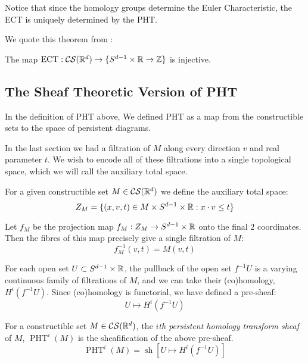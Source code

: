 Notice that since the homology groups determine the Euler Characteristic, the ECT is uniquely determined by the PHT. 

We quote this theorem from \cite{Curry2018Directions}:

\begin{theorem}
    The map \(\operatorname{ECT}:\mathcal{CS}(\mathbb{R}^d)\rightarrow \{S^{d-1}\times \mathbb{R}\rightarrow \mathbb{Z}\}\) is injective.
\end{theorem}

\subsection{The Sheaf Theoretic Version of PHT}

In the definition of PHT above, We defined PHT as a map from the constructible sets to the space of persistent diagrams.





In the last section we had a filtration of \(M\) along every direction \(v\) and real parameter \(t\). We wish to encode all of these filtrations into a single topological space, which we will call the auxiliary total space.

\begin{definition}
    For a given constructible set \(M\in \mathcal{CS}(\mathbb{R}^d)\) we define the auxiliary total space:
    \[Z_M = \{(x,v,t)\in M\times S^{d-1}\times \mathbb{R}: x\cdot v\leq t\}\]
\end{definition}

Let \(f_M\) be the projection map \(f_M:Z_M\rightarrow S^{d-1}\times \mathbb{R}\) onto the final 2 coordinates. Then the fibres of this map precisely give a single filtration of \(M\):
\[f_M^{-1}(v,t)=M(v,t)\]

For each open set \(U\subset S^{d-1}\times \mathbb{R}\), the pullback of the open set \(f^{-1}U\) is a varying continuous family of filtrations of \(M\), and we can take their (co)homology, \(H^i(f^{-1}U)\). Since (co)homology is functorial, we have defined a pre-sheaf:
\[U\mapsto H^i(f^{-1}U)\]

\begin{definition}
    For a constructible set \(M\in\mathcal{CS}(\mathbb{R}^d)\), the \textit{\(i\)th persistent homology transform sheaf} of \(M\), \(\operatorname{PHT}^i(M)\) is the sheafification of the above pre-sheaf.
    \[\operatorname{PHT}^i(M)=\operatorname{sh}[U\mapsto H^i(f^{-1}U)]\]
\end{definition}

